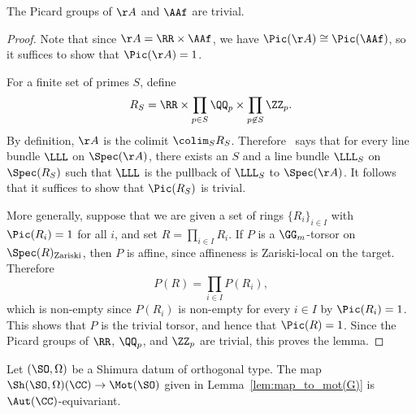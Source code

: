\begin{lemma}\label{lem:picard_adeles}
The Picard groups of $\AA$ and $\AAf$ are trivial.
\end{lemma}
\begin{proof}
Note that since $\AA = \RR \times \AAf$, we have $\Pic(\AA) \cong \Pic(\AAf)$, so it suffices to show that $\Pic(\AA) = 1$.

For a finite set of primes $S$, define
$$
R_S = \RR \times \prod_{p \in S} \QQ_p \times \prod_{p \not\in S} \ZZ_p.
$$
By definition, $\AA$ is the colimit $\colim_S R_S$. Therefore~\cite[Tag~01ZL]{SP} says that for every line bundle $\LLL$ on $\Spec(\AA)$, there exists an $S$ and a line bundle $\LLL_S$ on $\Spec(R_S)$ such that $\LLL$ is the pullback of $\LLL_S$ to $\Spec(\AA)$. It follows that it suffices to show that $\Pic(R_S)$ is trivial.

More generally, suppose that we are given a set of rings $\{R_i\}_{i \in I}$ with $\Pic(R_i) = 1$ for all $i$, and set $R = \prod_{i \in I} R_i$. If $P$ is a $\GG_m$-torsor on $\Spec(R)_{\textnormal{Zariski}}$, then $P$ is affine, since affineness is Zariski-local on the target. Therefore
$$
P(R) = \prod_{i \in I} P(R_i),
$$
which is non-empty since $P(R_i)$ is non-empty for every $i \in I$ by $\Pic(R_i) = 1$. This shows that $P$ is the trivial torsor, and hence that $\Pic(R) = 1$. Since the Picard groups of $\RR$, $\QQ_p$, and $\ZZ_p$ are trivial, this proves the lemma.
\end{proof}
\begin{proposition}
Let $(\SO,\Omega)$ be a Shimura datum of orthogonal type. The map $\Sh(\SO,\Omega)(\CC) \rightarrow \Mot(\SO)$ given in Lemma~\ref{lem:map_to_mot(G)} is $\Aut(\CC)$-equivariant.
\end{proposition}
